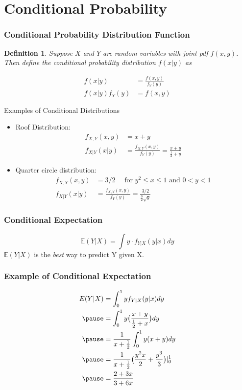 \documentclass[aspectratio=169, handout]{beamer}
\newtheorem{defn}{Definition}
\numberwithin{equation}{section}
\begin{document}
\section{Conditional Probability}

\begin{frame}
\frametitle{Conditional Probability Distribution Function}
\begin{defn}
Suppose $X$ and $Y$ are random variables with joint pdf $f(x,y)$.  Then define the \alert{conditional probability distribution} $f(x|y)$ as 

\begin{align*}
f(x|y) &= \frac{f(x, y) }{f_{Y}(y) } \\
f(x|y)f_{Y}(y)&= f(x, y)   
\end{align*}

\end{defn}

\end{frame}



\begin{frame}{Examples of Conditional Distributions}
\begin{itemize}
\item Roof Distribution:
\begin{align*}
f_{X,Y}(x,y)&=x+y\\
f_{X|Y}(x|y)&=\frac{f_{X,Y}(x,y)}{f_Y(y)}=\frac{x+y}{\frac{1}{2}+y}
\end{align*}
\item Quarter circle distribution:
\begin{align*}
f_{X,Y}(x,y)&=3/2 \quad \text{ for }y^2\leq x\leq 1 \text{ and }0<y<1\\
f_{X|Y}(x|y)&=\frac{f_{X,Y}(x,y)}{f_Y(y)}=\frac{3/2}{\frac{3}{2}\sqrt{y}}
\end{align*}
\end{itemize}


\end{frame}


\begin{frame}
\frametitle{Conditional Expectation}
$$\mathbb{E}(Y|X)=\int y\cdot f_{Y|X} (y|x)dy $$
$\mathbb{E}(Y|X)$ is the \emph{best} way to predict Y given X.

\end{frame}


\begin{frame}
\frametitle{Example of Conditional Expectation}
\begin{align*}
E(Y|X)&=\int_0^1 y f_{Y|X}(y|x)dy\\ \pause
&=\int_0^1 y \big(\frac{x+y}{\frac{1}{2}+x}\big)dy \\\pause
&=\frac{1}{x+\frac{1}{2}}\int_0^1 y (x+y)dy\\\pause
&=\frac{1}{x+\frac{1}{2}} \big(\frac{y^2x}{2} +\frac{y^3}{3}\big) |_0^1\\\pause
&=\frac{2+3x}{3+6x}
\end{align*}
\end{frame}
\end{document}
